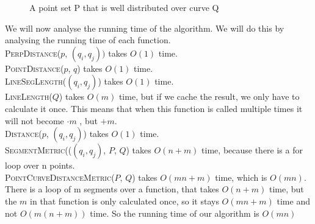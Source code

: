 \documentclass[a4paper,11pt]{article}
\begin{document}
\begin{figure}[H]
	\centering
	\label{fig:line-weight}
	\def\svgwidth{0.5\textwidth}
	
	\caption{A point set P that is well distributed over curve Q}
\end{figure}

 
	
	
We will now analyse the running time of the algorithm. 
We will do this by analysing the running time of each function.\\
\textsc{PerpDistance}($p$, $(q_i, q_j))$ takes $O(1)$ time.\\
\textsc{PointDistance}($p$, $q$) takes $O(1)$ time. \\
\textsc{LineSegLength}($(q_i, q_j)$) takes $O(1)$ time. \\
\textsc{LineLength}($Q$) takes $O(m)$ time, but if we cache the result, we only have to calculate it once. This means that when this function is called multiple times it will not become $\cdot m$ , but $+m$.\\
\textsc{Distance}($p$, $(q_i, q_j)$) takes $O(1)$ time.\\
\textsc{SegmentMetric}(($(q_i, q_j)$, $P$, $Q$) takes $O(n+m)$ time, because there is a for loop over n points. \\
\textsc{PointCurveDistanceMetric}($P$, $Q$)  takes $O(mn + m)$ time, which is $O(mn)$. 
There is a loop of m segments over a function, that takes $O(n+m)$ time, but the $m$ in that function is only calculated once, so it stays $O(mn+m)$ time and not $O(m(n+m))$ time.
So the running time of our algorithm is  $O(mn)$ \\
\end{document}
